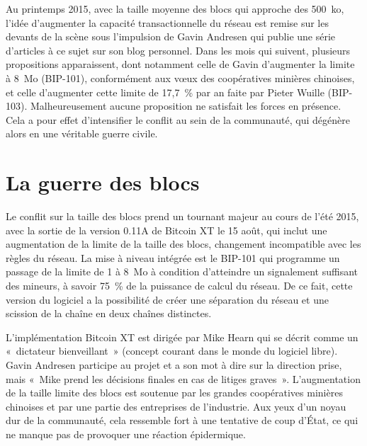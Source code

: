 Au printemps 2015, avec la taille moyenne des blocs qui approche des 500~ko, l'idée d'augmenter la capacité transactionnelle du réseau est remise sur les devants de la scène sous l'impulsion de Gavin Andresen qui publie une série d'articles à ce sujet sur son blog personnel. Dans les mois qui suivent, plusieurs propositions apparaissent, dont notamment celle de Gavin d'augmenter la limite à 8~Mo (BIP-101), conformément aux vœux des coopératives minières chinoises, et celle d'augmenter cette limite de 17,7~\% par an faite par Pieter Wuille (BIP-103). Malheureusement aucune proposition ne satisfait les forces en présence. Cela a pour effet d'intensifier le conflit au sein de la communauté, qui dégénère alors en une véritable guerre civile.

\section*{La guerre des blocs} %

Le conflit sur la taille des blocs prend un tournant majeur au cours de l'été 2015, avec la sortie de la version 0.11A de Bitcoin XT le 15 août, qui inclut une augmentation de la limite de la taille des blocs, changement incompatible avec les règles du réseau. La mise à niveau intégrée est le BIP-101 qui programme un passage de la limite de 1 à 8~Mo à condition d'atteindre un signalement suffisant des mineurs, à savoir 75~\% de la puissance de calcul du réseau. De ce fait, cette version du logiciel a la possibilité de créer une séparation du réseau et une scission de la chaîne en deux chaînes distinctes.

L'implémentation Bitcoin XT est dirigée par Mike Hearn qui se décrit comme un «~dictateur bienveillant~» (concept courant dans le monde du logiciel libre). Gavin Andresen participe au projet et a son mot à dire sur la direction prise, mais «~Mike prend les décisions finales en cas de litiges graves~». L'augmentation de la taille limite des blocs est soutenue par les grandes coopératives minières chinoises et par une partie des entreprises de l'industrie. Aux yeux d'un noyau dur de la communauté, cela ressemble fort à une tentative de coup d'État, ce qui ne manque pas de provoquer une réaction épidermique.

